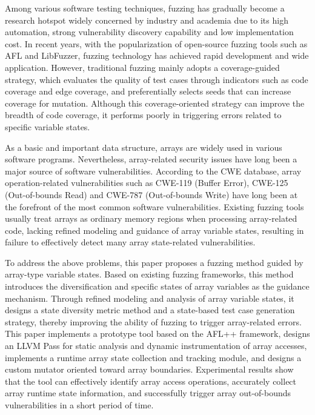 \documentclass[bachelor]{njupthesis}
\begin{document}
\begin{englishabstract}
Among various software testing techniques, fuzzing has gradually become a research hotspot widely concerned by industry and academia due to its high automation, strong vulnerability discovery capability and low implementation cost. In recent years, with the popularization of open-source fuzzing tools such as AFL and LibFuzzer, fuzzing technology has achieved rapid development and wide application. However, traditional fuzzing mainly adopts a coverage-guided strategy, which evaluates the quality of test cases through indicators such as code coverage and edge coverage, and preferentially selects seeds that can increase coverage for mutation. Although this coverage-oriented strategy can improve the breadth of code coverage, it performs poorly in triggering errors related to specific variable states.

As a basic and important data structure, arrays are widely used in various software programs. Nevertheless, array-related security issues have long been a major source of software vulnerabilities. According to the CWE database, array operation-related vulnerabilities such as CWE-119 (Buffer Error), CWE-125 (Out-of-bounds Read) and CWE-787 (Out-of-bounds Write) have long been at the forefront of the most common software vulnerabilities. Existing fuzzing tools usually treat arrays as ordinary memory regions when processing array-related code, lacking refined modeling and guidance of array variable states, resulting in failure to effectively detect many array state-related vulnerabilities.

To address the above problems, this paper proposes a fuzzing method guided by array-type variable states. Based on existing fuzzing frameworks, this method introduces the diversification and specific states of array variables as the guidance mechanism. Through refined modeling and analysis of array variable states, it designs a state diversity metric method and a state-based test case generation strategy, thereby improving the ability of fuzzing to trigger array-related errors. This paper implements a prototype tool based on the AFL++ framework, designs an LLVM Pass for static analysis and dynamic instrumentation of array accesses, implements a runtime array state collection and tracking module, and designs a custom mutator oriented toward array boundaries. Experimental results show that the tool can effectively identify array access operations, accurately collect array runtime state information, and successfully trigger array out-of-bounds vulnerabilities in a short period of time.

\end{englishabstract}
\end{document}
